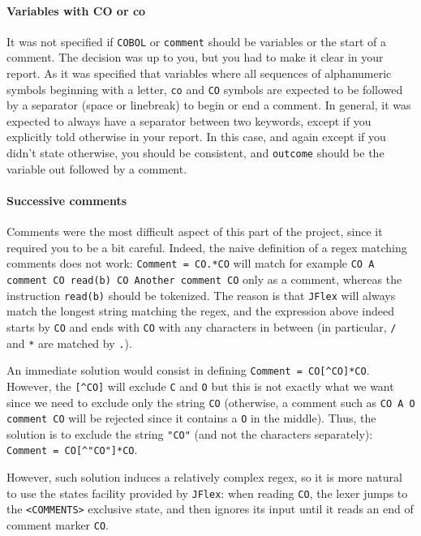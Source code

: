 \documentclass[a4paper]{article}
\newcommand{\JFlex}{\texttt{JFlex}\xspace}
\begin{document}
\paragraph{Variables with CO or co}
It was not specified if \verb#COBOL# or \verb#comment# should be variables or the start of a comment. The decision was up to you, but you had to make it clear in your report. As it was specified that variables where all sequences of alphanumeric symbols beginning with a letter, \verb#co# and \verb#CO# symbols are expected to be followed by a separator (space or linebreak) to begin or end a comment. In general, it was expected to always have a separator between two keywords, except if you explicitly told otherwise in your report. In this case, and again except if you didn't state otherwise, you should be consistent, and \verb#outcome# should be the variable out followed by a comment.


\paragraph{Successive comments}
Comments were the most difficult aspect of this part of the project, since it required you to be a bit careful. Indeed, the naive definition of a regex matching comments does not work: \verb#Comment = CO.*CO# will match for example \verb#CO A comment CO read(b) CO Another comment CO# only as a comment, whereas the instruction \verb#read(b)# should be tokenized. The reason is that \JFlex will always match the longest string matching the regex, and the expression above indeed starts by \texttt{CO} and ends with \texttt{CO} with any characters in between (in particular, \texttt{/} and \texttt{*} are matched by \texttt{.}).

An immediate solution would consist in defining \verb#Comment = CO[^CO]*CO#. However, the \verb#[^CO]# will exclude \texttt{C} and \texttt{O} but this is not exactly what we want since we need to exclude only the string \texttt{CO} (otherwise, a comment such as \verb#CO A O comment CO# will be rejected since it contains a \texttt{O} in the middle). Thus, the solution is to exclude the string \texttt{"CO"} (and not the characters separately): \verb#Comment = CO[^"CO"]*CO#.

However, such solution induces a relatively complex regex, so it is more natural to use the states facility provided by \JFlex: when reading \texttt{CO}, the lexer jumps to the \texttt{<COMMENTS>} exclusive state, and then ignores its input until it reads an end of comment marker \texttt{CO}.
\end{document}
